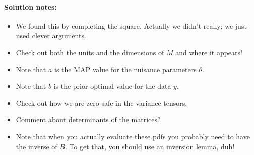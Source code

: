 \documentclass[12pt, letterpaper]{article}
\begin{document}
\paragraph{Solution notes:}
\begin{itemize}
\item
We found this by completing the square. Actually we didn't really; we just
used clever arguments.
\item
Check out both the units and the dimensions of $M$ and where it appears!
\item
Note that $a$ is the MAP value for the nuisance parameters $\theta$.
\item
Note that $b$ is the prior-optimal value for the data $y$.
\item
Check out how we are zero-safe in the variance tensors.
\item
Comment about determinants of the matrices?
\item
Note that when you actually evaluate these pdfs you probably need to have the
inverse of $B$. To get that, you should use an inversion lemma, duh!
\end{itemize}
\end{document}
